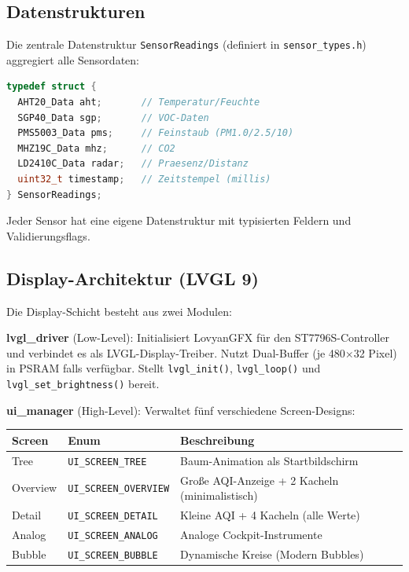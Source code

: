 \documentclass[a4paper,11pt]{article}
\begin{document}
\subsection{Datenstrukturen}

Die zentrale Datenstruktur \texttt{SensorReadings} (definiert in \texttt{sensor\_types.h}) aggregiert alle Sensordaten:

\begin{lstlisting}[language=C++]
typedef struct {
  AHT20_Data aht;       // Temperatur/Feuchte
  SGP40_Data sgp;       // VOC-Daten
  PMS5003_Data pms;     // Feinstaub (PM1.0/2.5/10)
  MHZ19C_Data mhz;      // CO2
  LD2410C_Data radar;   // Praesenz/Distanz
  uint32_t timestamp;   // Zeitstempel (millis)
} SensorReadings;
\end{lstlisting}

Jeder Sensor hat eine eigene Datenstruktur mit typisierten Feldern und Validierungsflags.

\subsection{Display-Architektur (LVGL 9)}

Die Display-Schicht besteht aus zwei Modulen:

\textbf{lvgl\_driver} (Low-Level): Initialisiert LovyanGFX für den ST7796S-Controller und verbindet es als LVGL-Display-Treiber. Nutzt Dual-Buffer (je 480$\times$32 Pixel) in PSRAM falls verfügbar. Stellt \texttt{lvgl\_init()}, \texttt{lvgl\_loop()} und \texttt{lvgl\_set\_brightness()} bereit.

\textbf{ui\_manager} (High-Level): Verwaltet fünf verschiedene Screen-Designs:

\begin{longtable}{l l p{7cm}}
\toprule
\rowcolor{tableheader}
\textbf{Screen} & \textbf{Enum} & \textbf{Beschreibung} \\
\midrule
Tree & \texttt{UI\_SCREEN\_TREE} & Baum-Animation als Startbildschirm \\
Overview & \texttt{UI\_SCREEN\_OVERVIEW} & Große AQI-Anzeige + 2 Kacheln (minimalistisch) \\
Detail & \texttt{UI\_SCREEN\_DETAIL} & Kleine AQI + 4 Kacheln (alle Werte) \\
Analog & \texttt{UI\_SCREEN\_ANALOG} & Analoge Cockpit-Instrumente \\
Bubble & \texttt{UI\_SCREEN\_BUBBLE} & Dynamische Kreise (Modern Bubbles) \\
\bottomrule
\end{longtable}
\end{document}
